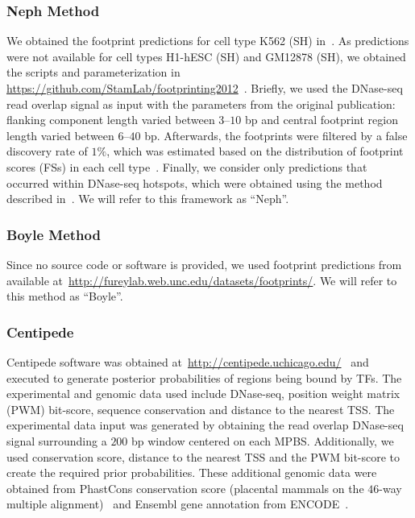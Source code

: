 \subsubsection{Neph Method}

We obtained the footprint predictions for cell type K562 (SH) in~\cite{neph2012a}. As predictions were not available for cell types H1-hESC (SH) and GM12878 (SH), we obtained the scripts and parameterization in \url{https://github.com/StamLab/footprinting2012}~\citep{neph2012a}. Briefly, we used the DNase-seq read overlap signal as input with the parameters from the original publication: flanking component length varied between $3$--$10$ bp and central footprint region length varied between $6$--$40$ bp. Afterwards, the footprints were filtered by a false discovery rate of $1\%$, which was estimated based on the distribution of footprint scores (FSs) in each cell type~\citep{neph2012a}. Finally, we consider only predictions that occurred within DNase-seq hotspots, which were obtained using the method described in~\cite{sabo2004b}. We will refer to this framework as ``Neph''.

\subsubsection{Boyle Method}

Since no source code or software is provided, we used footprint predictions from~\cite{boyle2011} available at~\url{http://fureylab.web.unc.edu/datasets/footprints/}. We will refer to this method as ``Boyle''.

\subsubsection{Centipede}

Centipede software was obtained at~\url{http://centipede.uchicago.edu/}~\citep{pique2011} and executed to generate posterior probabilities of regions being bound by TFs. The experimental and genomic data used include DNase-seq, position weight matrix (PWM) bit-score, sequence conservation and distance to the nearest TSS. The experimental data input was generated by obtaining the read overlap DNase-seq signal surrounding a $200$ bp window centered on each MPBS. Additionally, we used conservation score, distance to the nearest TSS and the PWM bit-score to create the required prior probabilities. These additional genomic data were obtained from PhastCons conservation score (placental mammals on the $46$-way multiple alignment)~\citep{siepel2005} and Ensembl gene annotation from ENCODE~\citep{hubbard2002}.

